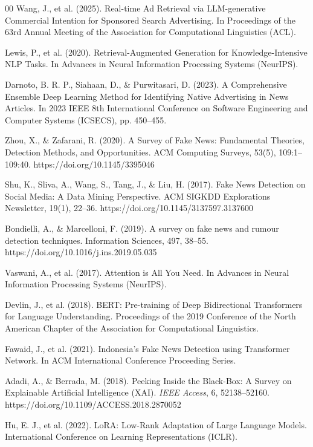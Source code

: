 \documentclass{ieeeaccess}
\begin{document}
\begin{thebibliography}{00}
 Wang, J., et al. (2025). Real-time Ad Retrieval via LLM-generative Commercial Intention for Sponsored Search Advertising. In Proceedings of the 63rd Annual Meeting of the Association for Computational Linguistics (ACL).

 Lewis, P., et al. (2020). Retrieval-Augmented Generation for Knowledge-Intensive NLP Tasks. In Advances in Neural Information Processing Systems (NeurIPS).

 Darnoto, B. R. P., Siahaan, D., \& Purwitasari, D. (2023). A Comprehensive Ensemble Deep Learning Method for Identifying Native Advertising in News Articles. In 2023 IEEE 8th International Conference on Software Engineering and Computer Systems (ICSECS), pp. 450--455.

 Zhou, X., \& Zafarani, R. (2020). A Survey of Fake News: Fundamental Theories, Detection Methods, and Opportunities. ACM Computing Surveys, 53(5), 109:1--109:40. https://doi.org/10.1145/3395046

 Shu, K., Sliva, A., Wang, S., Tang, J., \& Liu, H. (2017). Fake News Detection on Social Media: A Data Mining Perspective. ACM SIGKDD Explorations Newsletter, 19(1), 22--36. https://doi.org/10.1145/3137597.3137600

 Bondielli, A., \& Marcelloni, F. (2019). A survey on fake news and rumour detection techniques. Information Sciences, 497, 38--55. https://doi.org/10.1016/j.ins.2019.05.035

 Vaswani, A., et al. (2017). Attention is All You Need. In Advances in Neural Information Processing Systems (NeurIPS).

 Devlin, J., et al. (2018). BERT: Pre-training of Deep Bidirectional Transformers for Language Understanding. Proceedings of the 2019 Conference of the North American Chapter of the Association for Computational Linguistics.

 Fawaid, J., et al. (2021). Indonesia’s Fake News Detection using Transformer Network. In ACM International Conference Proceeding Series.

 Adadi, A., \& Berrada, M. (2018). Peeking Inside the Black-Box: A Survey on Explainable Artificial Intelligence (XAI). \textit{IEEE Access}, 6, 52138--52160. https://doi.org/10.1109/ACCESS.2018.2870052

 Hu, E. J., et al. (2022). LoRA: Low-Rank Adaptation of Large Language Models. International Conference on Learning Representations (ICLR).


\end{thebibliography}
\end{document}
